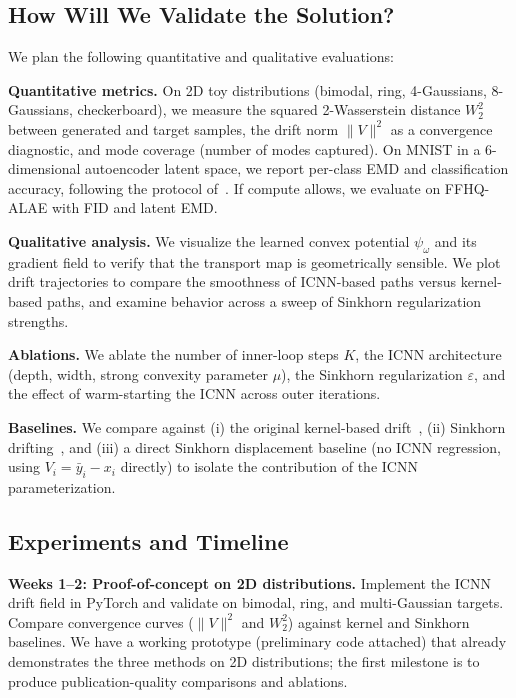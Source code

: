 \documentclass[10pt,conference,compsocconf]{IEEEtran}
\begin{document}
\subsection{How Will We Validate the Solution?}

We plan the following quantitative and qualitative evaluations:

\textbf{Quantitative metrics.}
On 2D toy distributions (bimodal, ring, 4-Gaussians, 8-Gaussians, checkerboard), we measure the squared 2-Wasserstein distance $W_2^2$ between generated and target samples, the drift norm $\|V\|^2$ as a convergence diagnostic, and mode coverage (number of modes captured).
On MNIST in a 6-dimensional autoencoder latent space, we report per-class EMD and classification accuracy, following the protocol of~\cite{he2026sinkhorn}.
If compute allows, we evaluate on FFHQ-ALAE with FID and latent EMD.

\textbf{Qualitative analysis.}
We visualize the learned convex potential $\psi_\omega$ and its gradient field to verify that the transport map is geometrically sensible.
We plot drift trajectories to compare the smoothness of ICNN-based paths versus kernel-based paths, and examine behavior across a sweep of Sinkhorn regularization strengths.

\textbf{Ablations.}
We ablate the number of inner-loop steps $K$, the ICNN architecture (depth, width, strong convexity parameter $\mu$), the Sinkhorn regularization $\varepsilon$, and the effect of warm-starting the ICNN across outer iterations.

\textbf{Baselines.}
We compare against (i) the original kernel-based drift~\cite{deng2026drifting}, (ii) Sinkhorn drifting~\cite{he2026sinkhorn}, and (iii) a direct Sinkhorn displacement baseline (no ICNN regression, using $V_i = \bar{y}_i - x_i$ directly) to isolate the contribution of the ICNN parameterization.


\subsection{Experiments and Timeline}

\textbf{Weeks 1--2: Proof-of-concept on 2D distributions.}
Implement the ICNN drift field in PyTorch and validate on bimodal, ring, and multi-Gaussian targets.
Compare convergence curves ($\|V\|^2$ and $W_2^2$) against kernel and Sinkhorn baselines.
We have a working prototype (preliminary code attached) that already demonstrates the three methods on 2D distributions; the first milestone is to produce publication-quality comparisons and ablations.
\end{document}
